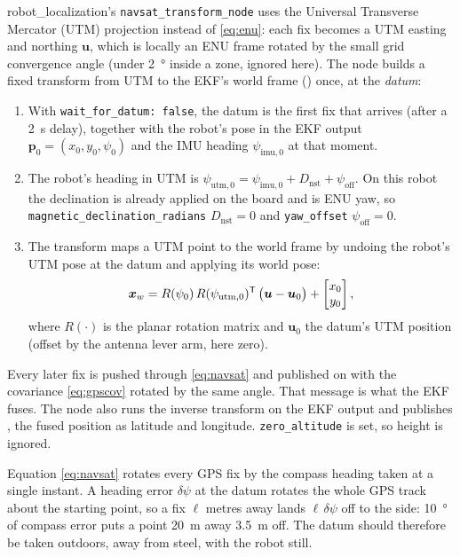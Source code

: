 robot\_localization's \texttt{navsat\_transform\_node} \cite{moore2014generalized}
uses the Universal Transverse Mercator (UTM) projection instead of
\eqref{eq:enu}: each fix becomes a UTM easting and northing $\bm u$, which is
locally an ENU frame rotated by the small grid convergence angle (under
\SI{2}{\degree} inside a zone, ignored here). The node builds a fixed
transform from UTM to the EKF's world frame () once, at the
\emph{datum}:
\begin{enumerate}
\item With \texttt{wait\_for\_datum: false}, the datum is the first fix that
  arrives (after a \SI{2}{s} delay), together with the robot's pose in the EKF
  output $\bm p_0=(x_0,y_0,\psi_0)$ and the IMU heading $\psi_{\mathrm{imu},0}$
  at that moment.
\item The robot's heading in UTM is
  $\psi_{\mathrm{utm},0}=\psi_{\mathrm{imu},0}+D_{\mathrm{nst}}+\psi_{\mathrm{off}}$.
  On this robot the declination is already applied on the board and
   is ENU yaw, so \texttt{magnetic\_declination\_radians}
  $D_{\mathrm{nst}}=0$ and \texttt{yaw\_offset} $\psi_{\mathrm{off}}=0$.
\item The transform maps a UTM point to the world frame by undoing the
  robot's UTM pose at the datum and applying its world pose:
\begin{equation}\label{eq:navsat}
\bm x_w = R(\psi_0)\,R(\psi_{\mathrm{utm},0})^{\mathsf T}\,\bigl(\bm u-\bm u_0\bigr)
          + \begin{bmatrix}x_0\\y_0\end{bmatrix},
\end{equation}
where $R(\cdot)$ is the planar rotation matrix and $\bm u_0$ the datum's UTM
position (offset by the antenna lever arm, here zero).
\end{enumerate}
Every later fix is pushed through \eqref{eq:navsat} and published on
 with the covariance \eqref{eq:gpscov} rotated by the
same angle. That message is what the EKF fuses. The node also runs the
inverse transform on the EKF output and publishes , the
fused position as latitude and longitude. \texttt{zero\_altitude} is set, so
height is ignored.

\begin{remark}
Equation \eqref{eq:navsat} rotates every GPS fix by the compass heading taken
at a single instant. A heading error $\delta\psi$ at the datum rotates the
whole GPS track about the starting point, so a fix $\ell$ metres away lands
$\ell\,\delta\psi$ off to the side: \SI{10}{\degree} of compass error puts a
point \SI{20}{m} away \SI{3.5}{m} off. The datum should therefore be taken
outdoors, away from steel, with the robot still.
\end{remark}
